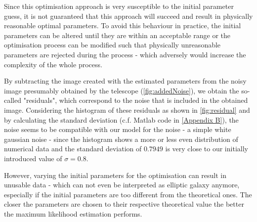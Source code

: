 Since this optimisation approach is very susceptible to the initial parameter guess, it is not guaranteed that this approach will succeed and result in physically reasonable optimal parameters. To avoid this behaviour in practice, the initial parameters can be altered until they are within an acceptable range or the optimisation process can be modified such that physically unreasonable parameters are rejected during the process - which adversely would increase the complexity of the whole process.

By subtracting the image created with the estimated parameters from the noisy image presumably obtained by the telescope (\cref{fig:addedNoise}), we obtain the so-called "residuals", which correspond to the noise that is included in the obtained image.
Considering the histogram of these residuals as shown in \cref{fig:residual} and by calculating the standard deviation (c.f. Matlab code in \cref{Appendix B}), the noise seems to be compatible with our model for the noise - a simple white gaussian noise - since the histogram shows a more or less even distribution of numerical data and the standard deviation of $0.7949$ is very close to our initially introduced value of $\sigma = 0.8$.



However, varying the initial parameters for the optimisation can result in unusable data - which can not even be interpreted as elliptic galaxy anymore, especially if the initial parameters are too different from the theoretical ones. The closer the parameters are chosen to their respective theoretical value the better the maximum likelihood estimation performs.












